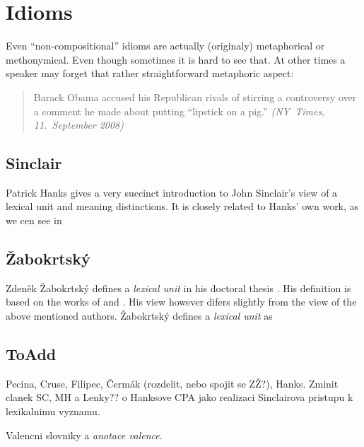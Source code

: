 
\chapter{Idioms}
Even ``non-compositional'' idioms are actually (originaly) metaphorical or methonymical.  Even though sometimes it is hard to see that. At other times a speaker may forget that rather straightforward metaphoric aspect:

\begin{quote}
Barack Obama accused his Republican rivals of stirring a controversy over a comment he made about putting “lipstick on a pig.” \emph{(NY~Times, 11.~September 2008)}
\end{quote}

\section{Sinclair}
Patrick Hanks gives a very succinct introduction to John Sinclair's \citep{sinclair:wiki} view of a lexical unit and meaning distinctions. It is closely related to Hanks' own work, as we cen see in \citet{hanks:norms-and-exploitations}

\section{Žabokrtský}
Zdeněk Žabokrtský defines a \emph{lexical unit} in his doctoral thesis \citep{zabokrtsky:2005a}. His definition is based on the works of \citet{cermak:91} and \citet{filipec:1994}. His view however difers slightly from the view of the above mentioned authors. Žabokrtský defines a \emph{lexical unit} as

\section{ToAdd}
Pecina, Cruse, Filipec, Čermák (rozdelit, nebo spojit se ZŽ?), Hanks. Zminit clanek SC, MH a Lenky?? o Hanksove CPA jako realizaci Sinclairova pristupu k lexikalnimu vyznamu.

Valencni slovniky a \emph{anotace valence}.